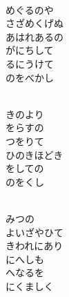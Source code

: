\documentclass[10pt,b5j]{tarticle} %
\begin{document}
\begin{enumerate}
\begin{minipage}[c]{\blocksize}
        \vspace{\linespace}
        \item~\\
        めぐるのや\\
        さざめくげぬ\\
        あはれあるの\\
        がにちして\\
        るにうけて\\
        のをべかし
        
    \end{minipage}
    \begin{minipage}[c]{\blocksize}
        
        \vspace{\linespace}
        \item~\\
        きのより\\
        をらすの\\
        つをりて\\
        ひのきほどき\\
        をしての\\
        のをくし
        
        
    \end{minipage}
    \begin{minipage}[c]{\blocksize}
        
        \vspace{\linespace}
        \item~\\
        みつの\\
        よいざやひて\\
        きわれにあり\\
        にへしも\\
        へなるを\\
        にくましく
    
    \end{minipage}
\end{enumerate} %
\end{document}
